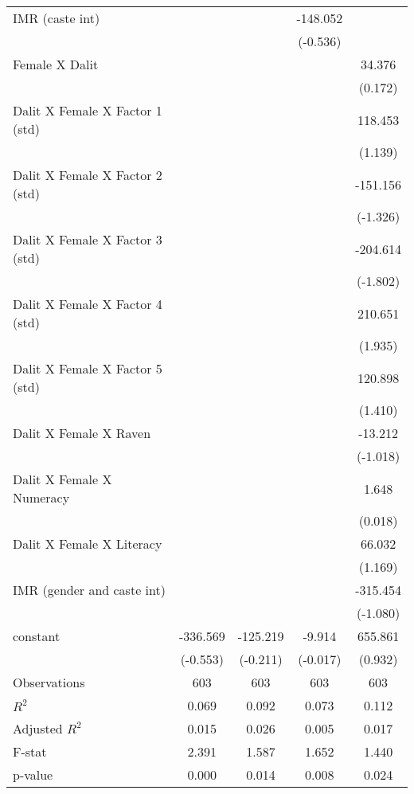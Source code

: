 \begin{table}[htbp]
{\begin{tabular}{lcccc}
    IMR (caste int) &       &       & -148.052 &  \\
          &       &       & (-0.536) &  \\
    Female X Dalit &       &       &       & 34.376 \\
          &       &       &       & (0.172) \\
    Dalit X Female X Factor 1 (std) &       &       &       & 118.453 \\
          &       &       &       & (1.139) \\
    Dalit X Female X Factor 2 (std) &       &       &       & -151.156 \\
          &       &       &       & (-1.326) \\
    Dalit X Female X Factor 3 (std) &       &       &       & -204.614 \\
          &       &       &       & (-1.802) \\
    Dalit X Female X Factor 4 (std) &       &       &       & 210.651 \\
          &       &       &       & (1.935) \\
    Dalit X Female X Factor 5 (std) &       &       &       & 120.898 \\
          &       &       &       & (1.410) \\
    Dalit X Female X Raven &       &       &       & -13.212 \\
          &       &       &       & (-1.018) \\
    Dalit X Female X Numeracy &       &       &       & 1.648 \\
          &       &       &       & (0.018) \\
    Dalit X Female X Literacy &       &       &       & 66.032 \\
          &       &       &       & (1.169) \\
    IMR (gender and caste int) &       &       &       & -315.454 \\
          &       &       &       & (-1.080) \\
    constant & -336.569 & -125.219 & -9.914 & 655.861 \\
          & (-0.553) & (-0.211) & (-0.017) & (0.932) \\
    \midrule
    Observations & 603   & 603   & 603   & 603 \\
    $R^2$ & 0.069 & 0.092 & 0.073 & 0.112 \\
    Adjusted $R^2$ & 0.015 & 0.026 & 0.005 & 0.017 \\
    F-stat & 2.391 & 1.587 & 1.652 & 1.440 \\
    p-value & 0.000 & 0.014 & 0.008 & 0.024 \\
    \bottomrule
    \end{tabular}%
    }
  \label{tab:addlabel}%
\end{table}%
